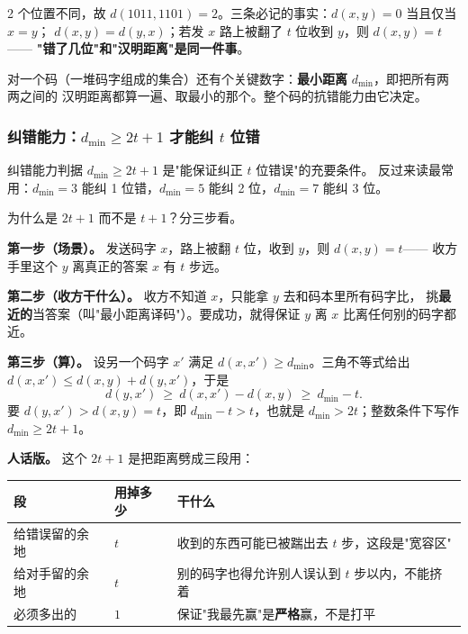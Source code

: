 2 个位置不同，故 $d(1011,1101)=2$。三条必记的事实：$d(x,y)=0$ 当且仅当 $x=y$；
$d(x,y)=d(y,x)$；若发 $x$ 路上被翻了 $t$ 位收到 $y$，则 $d(x,y)=t$——
\textbf{"错了几位"和"汉明距离"是同一件事}。

对一个码（一堆码字组成的集合）还有个关键数字：\textbf{最小距离} $d_{\min}$，即把所有两两之间的
汉明距离都算一遍、取最小的那个。整个码的抗错能力由它决定。

\subsubsection{纠错能力：$d_{\min}\ge 2t+1$ 才能纠 $t$ 位错}

\begin{defbox}{纠错能力判据}
$d_{\min}\ge 2t+1$ 是"能保证纠正 $t$ 位错误"的充要条件。
反过来读最常用：$d_{\min}=3$ 能纠 1 位错，$d_{\min}=5$ 能纠 2 位，$d_{\min}=7$ 能纠 3 位。
\end{defbox}

为什么是 $2t+1$ 而不是 $t+1$？分三步看。

\textbf{第一步（场景）。} 发送码字 $x$，路上被翻 $t$ 位，收到 $y$，则 $d(x,y)=t$——
收方手里这个 $y$ 离真正的答案 $x$ 有 $t$ 步远。

\textbf{第二步（收方干什么）。} 收方不知道 $x$，只能拿 $y$ 去和码本里所有码字比，
挑\textbf{最近的}当答案（叫"最小距离译码"）。要成功，就得保证 $y$ 离 $x$ 比离任何别的码字都近。

\textbf{第三步（算）。} 设另一个码字 $x'$ 满足 $d(x,x')\ge d_{\min}$。三角不等式给出
$d(x,x')\le d(x,y)+d(y,x')$，于是
\[
d(y,x')\ \ge\ d(x,x')-d(x,y)\ \ge\ d_{\min}-t .
\]
要 $d(y,x')>d(x,y)=t$，即 $d_{\min}-t>t$，也就是 $d_{\min}>2t$；整数条件下写作
$d_{\min}\ge 2t+1$。

\textbf{人话版。} 这个 $2t+1$ 是把距离劈成三段用：

\begin{center}\small
\setlength{\tabcolsep}{6pt}
\begin{tabular}{@{}lll@{}}
\toprule
段 & 用掉多少 & 干什么\\
\midrule
给错误留的余地 & $t$ & 收到的东西可能已被踹出去 $t$ 步，这段是"宽容区"\\
给对手留的余地 & $t$ & 别的码字也得允许别人误认到 $t$ 步以内，不能挤着\\
必须多出的 & $1$ & 保证"我最先赢"是\textbf{严格}赢，不是打平\\
\bottomrule
\end{tabular}
\end{center}

